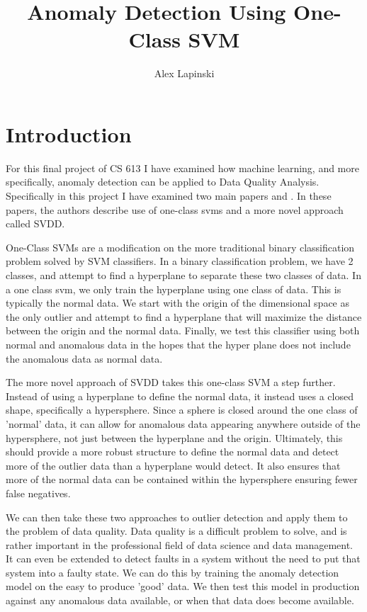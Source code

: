 \documentclass[journal]{IEEEtran}
\begin{document}
\title{Anomaly Detection Using One-Class SVM}
\author{Alex Lapinski}

%

\maketitle


\section{Introduction}
For this final project of CS 613 I have examined how machine learning, and more specifically, anomaly detection can be applied to Data Quality Analysis. Specifically in this project I have examined two main papers \cite{Scholkopf} and \cite{Tax}. In these papers, the authors describe use of one-class svms and a more novel approach called SVDD.

One-Class SVMs are a modification on the more traditional binary classification problem solved by SVM classifiers. In a binary classification problem, we have 2 classes, and attempt to find a hyperplane to separate these two classes of data. In a one class svm, we only train the hyperplane using one class of data. This is typically the normal data. We start with the origin of the dimensional space as the only outlier and attempt to find a hyperplane that will maximize the distance between the origin and the normal data. Finally, we test this classifier using both normal and anomalous data in the hopes that the hyper plane does not include the anomalous data as normal data.

The more novel approach of SVDD takes this one-class SVM a step further. Instead of using a hyperplane to define the normal data, it instead uses a closed shape, specifically a hypersphere. Since a sphere is closed around the one class of 'normal' data, it can allow for anomalous data appearing anywhere outside of the hypersphere, not just between the hyperplane and the origin. Ultimately, this should provide a more robust structure to define the normal data and detect more of the outlier data than a hyperplane would detect. It also ensures that more of the normal data can be contained within the hypersphere ensuring fewer false negatives.

We can then take these two approaches to outlier detection and apply them to the problem of data quality. Data quality is a difficult problem to solve, and is rather important in the professional field of data science and data management. It can even be extended to detect faults in a system without the need to put that system into a faulty state. We can do this by training the anomaly detection model on the easy to produce 'good' data. We then test this model in production against any anomalous data available, or when that data does become available.
\end{document}

